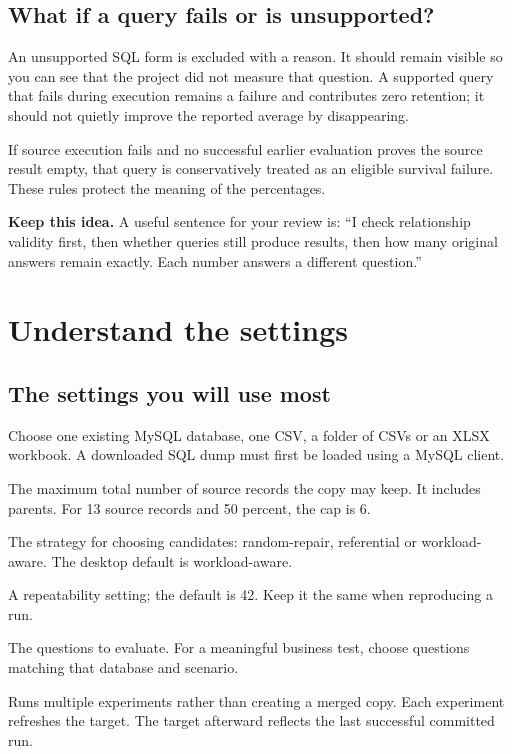 \documentclass[12pt,a4paper,oneside]{report}
\newcommand{\reviewpoint}[1]{\par\begingroup\setlength{\fboxsep}{9pt}\noindent\colorbox{wash}{\parbox{\dimexpr\linewidth-18pt\relax}{\textbf{Keep this idea.} #1}}\endgroup\par}
\begin{document}
\section{What if a query fails or is unsupported?}
An unsupported SQL form is excluded with a reason. It should remain visible so you can see that the project did not measure that question. A supported query that fails during execution remains a failure and contributes zero retention; it should not quietly improve the reported average by disappearing.

If source execution fails and no successful earlier evaluation proves the source result empty, that query is conservatively treated as an eligible survival failure. These rules protect the meaning of the percentages.

\reviewpoint{A useful sentence for your review is: ``I check relationship validity first, then whether queries still produce results, then how many original answers remain exactly. Each number answers a different question.''}

\chapter{Understand the settings}
\section{The settings you will use most}
\begin{description}[style=nextline,leftmargin=1.5em,labelindent=0pt]
\item[Input] Choose one existing MySQL database, one CSV, a folder of CSVs or an XLSX workbook. A downloaded SQL dump must first be loaded using a MySQL client.
\item[Budget percentage] The maximum total number of source records the copy may keep. It includes parents. For 13 source records and 50 percent, the cap is 6.
\item[Method] The strategy for choosing candidates: random-repair, referential or workload-aware. The desktop default is workload-aware.
\item[Seed] A repeatability setting; the default is 42. Keep it the same when reproducing a run.
\item[Workload file] The questions to evaluate. For a meaningful business test, choose questions matching that database and scenario.
\item[Compare methods] Runs multiple experiments rather than creating a merged copy. Each experiment refreshes the target. The target afterward reflects the last successful committed run.
\end{description}
\end{document}
